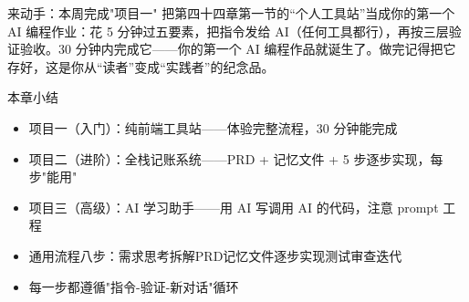 \begin{tcbpractice}{来动手：本周完成"项目一"}
把第四十四章第一节的“个人工具站”当成你的第一个 AI 编程作业：花 5 分钟过五要素，把指令发给 AI（任何工具都行），再按三层验证验收。30 分钟内完成它——你的第一个 AI 编程作品就诞生了。做完记得把它存好，这是你从“读者”变成“实践者”的纪念品。

\end{tcbpractice}

\begin{tcbsummary}{本章小结}
\begin{itemize}
  \item 项目一（入门）：纯前端工具站——体验完整流程，30 分钟能完成
  \item 项目二（进阶）：全栈记账系统——PRD + 记忆文件 + 5 步逐步实现，每步"能用"
  \item 项目三（高级）：AI 学习助手——用 AI 写调用 AI 的代码，注意 prompt 工程
  \item 通用流程八步：需求思考拆解PRD记忆文件逐步实现测试审查迭代
  \item 每一步都遵循"指令-验证-新对话"循环
\end{itemize}

\end{tcbsummary}
